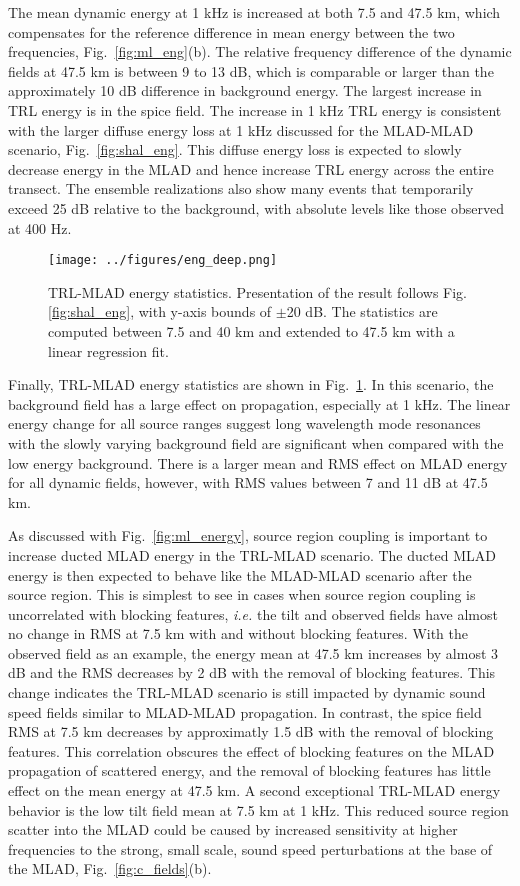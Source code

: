 \documentclass[preprint,NumberedRefs]{JASA}
\begin{document}
The mean dynamic energy at 1 kHz is increased at both 7.5 and 47.5 km, which compensates for the reference difference in mean energy between the two frequencies, Fig.~\ref{fig:ml_eng}(b). The relative frequency difference of the dynamic fields at 47.5 km is between 9 to 13 dB, which is comparable or larger than the approximately 10 dB difference in background energy. The largest increase in TRL energy is in the spice field. The increase in 1 kHz TRL energy is consistent with the larger diffuse energy loss at 1 kHz discussed for the MLAD-MLAD scenario, Fig.~\ref{fig:shal_eng}. This diffuse energy loss is expected to slowly decrease energy in the MLAD and hence increase TRL energy across the entire transect. The ensemble realizations also show many events that temporarily exceed 25 dB relative to the background, with absolute levels like those observed at 400 Hz.

\begin{figure}
\texttt{[image: ../figures/eng\_deep.png]}
    \caption{TRL-MLAD energy statistics. Presentation of the result follows Fig. \ref{fig:shal_eng}, with y-axis bounds of $\pm$20 dB. The statistics are computed between 7.5 and 40 km and extended to 47.5 km with a linear regression fit.}
    \label{fig:deep_eng}
\end{figure}
Finally, TRL-MLAD energy statistics are shown in Fig.~\ref{fig:deep_eng}. In this scenario, the background field has a large effect on propagation, especially at 1 kHz. The linear energy change for all source ranges suggest long wavelength mode resonances with the slowly varying background field\cite{colosi21} are significant when compared with the low energy background. There is a larger mean and RMS effect on MLAD energy for all dynamic fields, however, with RMS values between 7 and 11 dB at 47.5 km.

As discussed with Fig.~\ref{fig:ml_energy}, source region coupling is important to increase ducted MLAD energy in the TRL-MLAD scenario. The ducted MLAD energy is then expected to behave like the MLAD-MLAD scenario after the source region. This is simplest to see in cases when source region coupling is uncorrelated with blocking features, \emph{i.e.} the tilt and observed fields have almost no change in RMS at 7.5 km with and without blocking features. With the observed field as an example, the energy mean at 47.5 km increases by almost 3 dB and the RMS decreases by 2 dB with the removal of blocking features. This change indicates the TRL-MLAD scenario is still impacted by dynamic sound speed fields similar to MLAD-MLAD propagation. In contrast, the spice field RMS at 7.5 km decreases by approximatly 1.5 dB with the removal of blocking features. This correlation obscures the effect of blocking features on the MLAD propagation of scattered energy, and the removal of blocking features has little effect on the mean energy at 47.5 km. A second exceptional TRL-MLAD energy behavior is the low tilt field mean at 7.5 km at 1 kHz. This reduced source region scatter into the MLAD could be caused by increased sensitivity at higher frequencies to the strong, small scale, sound speed perturbations at the base of the MLAD, Fig.~\ref{fig:c_fields}(b).
\end{document}
